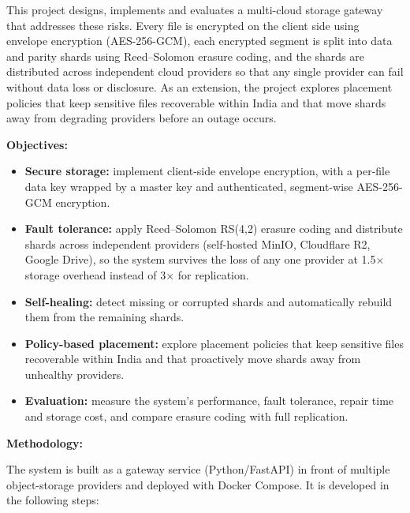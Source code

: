 \documentclass[11pt,a4paper]{article}
\newcommand{\sectionhead}[1]{\vspace{10pt}\textbf{#1}\par}
\begin{document}
This project designs, implements and evaluates a multi-cloud storage gateway that addresses these risks.
Every file is encrypted on the client side using envelope encryption (AES-256-GCM), each encrypted
segment is split into data and parity shards using Reed--Solomon erasure coding, and the shards are
distributed across independent cloud providers so that any single provider can fail without data loss or
disclosure. As an extension, the project explores placement policies that keep sensitive files
recoverable within India and that move shards away from degrading providers before an outage occurs.

\newpage

\sectionhead{Objectives:}

\begin{itemize}[leftmargin=*,label=\textbullet,itemsep=4pt]
  \item \textbf{Secure storage:} implement client-side envelope encryption, with a per-file data key
        wrapped by a master key and authenticated, segment-wise AES-256-GCM encryption.
  \item \textbf{Fault tolerance:} apply Reed--Solomon RS(4,2) erasure coding and distribute shards across
        independent providers (self-hosted MinIO, Cloudflare R2, Google Drive), so the system survives the
        loss of any one provider at 1.5$\times$ storage overhead instead of 3$\times$ for replication.
  \item \textbf{Self-healing:} detect missing or corrupted shards and automatically rebuild them from the
        remaining shards.
  \item \textbf{Policy-based placement:} explore placement policies that keep sensitive files recoverable
        within India and that proactively move shards away from unhealthy providers.
  \item \textbf{Evaluation:} measure the system's performance, fault tolerance, repair time and storage
        cost, and compare erasure coding with full replication.
\end{itemize}

\sectionhead{Methodology:}

The system is built as a gateway service (Python/FastAPI) in front of multiple object-storage providers
and deployed with Docker Compose. It is developed in the following steps:
\end{document}

